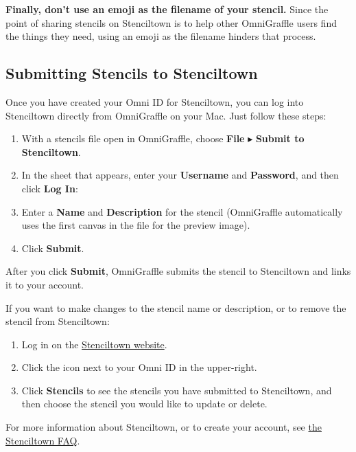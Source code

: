 \documentclass[../main.tex]{subfiles}
\begin{document}
\textbf{Finally, don't use an emoji as the filename of your stencil.} Since the point of sharing
stencils on Stenciltown is to help other OmniGraffle users find the things they need, using an
emoji as the filename hinders that process.


\subsection{Submitting Stencils to Stenciltown}

Once you have created your Omni ID for Stenciltown, you can log into Stenciltown directly from
OmniGraffle on your Mac. Just follow these steps:

\begin{enumerate}
\item With a stencils file open in OmniGraffle, choose \textbf{File} $\blacktriangleright$
  \textbf{Submit to Stenciltown}.
\item In the sheet that appears, enter your \textbf{Username} and \textbf{Password}, and then
  click \textbf{Log In}:

\item Enter a \textbf{Name} and \textbf{Description} for the stencil (OmniGraffle
  automatically uses the first canvas in the file for the preview image).

\item Click \textbf{Submit}.
\end{enumerate}

After you click \textbf{Submit}, OmniGraffle submits the stencil to Stenciltown and links it to
your account.

If you want to make changes to the stencil name or description, or to remove the stencil from
Stenciltown:

\begin{enumerate}
\item Log in on the \href{https://stenciltown.omnigroup.com}{Stenciltown website}.
\item Click the icon next to your Omni ID in the upper-right.
\item Click \textbf{Stencils} to see the stencils you have submitted to Stenciltown, and then
  choose the stencil you would like to update or delete.
\end{enumerate}

For more information about Stenciltown, or to create your account, see
\href{https://stenciltown.omnigroup.com/faq/}{the Stenciltown FAQ}.
\end{document}
